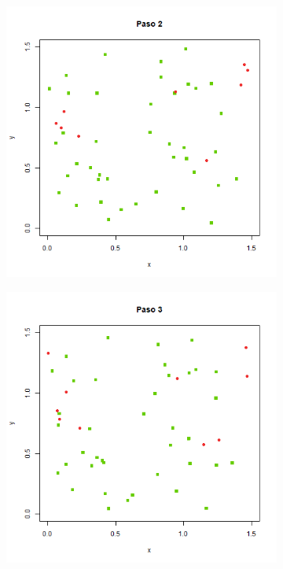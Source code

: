 \documentclass[a4paper]{article}
\begin{document}
\begin{figure}[h!]
\begin{subfigure}[b]{0.45\linewidth}
\includegraphics[width=\linewidth]{reto2,2.png}
\caption{}
\label{q5}
\end{subfigure}
\begin{subfigure}[b]{0.45\linewidth}
\includegraphics[width=\linewidth]{reto2,3.png}

\end{subfigure}
\end{figure}
\end{document}
